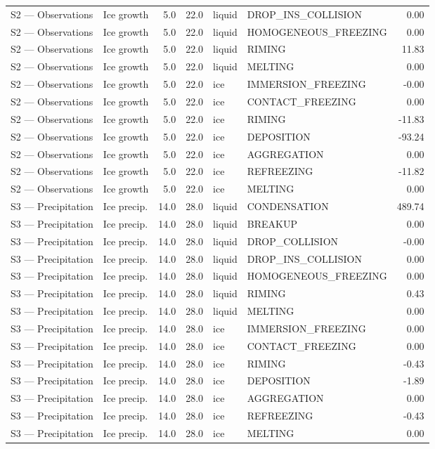 \begin{table}[p]
{\begin{tabular}{llrrllr}
S2 — Observations & Ice growth & 5.0 & 22.0 & liquid & DROP\_INS\_COLLISION & 0.00 \\
S2 — Observations & Ice growth & 5.0 & 22.0 & liquid & HOMOGENEOUS\_FREEZING & 0.00 \\
S2 — Observations & Ice growth & 5.0 & 22.0 & liquid & RIMING & 11.83 \\
S2 — Observations & Ice growth & 5.0 & 22.0 & liquid & MELTING & 0.00 \\
S2 — Observations & Ice growth & 5.0 & 22.0 & ice & IMMERSION\_FREEZING & -0.00 \\
S2 — Observations & Ice growth & 5.0 & 22.0 & ice & CONTACT\_FREEZING & 0.00 \\
S2 — Observations & Ice growth & 5.0 & 22.0 & ice & RIMING & -11.83 \\
S2 — Observations & Ice growth & 5.0 & 22.0 & ice & DEPOSITION & -93.24 \\
S2 — Observations & Ice growth & 5.0 & 22.0 & ice & AGGREGATION & 0.00 \\
S2 — Observations & Ice growth & 5.0 & 22.0 & ice & REFREEZING & -11.82 \\
S2 — Observations & Ice growth & 5.0 & 22.0 & ice & MELTING & 0.00 \\
S3 — Precipitation & Ice precip. & 14.0 & 28.0 & liquid & CONDENSATION & 489.74 \\
S3 — Precipitation & Ice precip. & 14.0 & 28.0 & liquid & BREAKUP & 0.00 \\
S3 — Precipitation & Ice precip. & 14.0 & 28.0 & liquid & DROP\_COLLISION & -0.00 \\
S3 — Precipitation & Ice precip. & 14.0 & 28.0 & liquid & DROP\_INS\_COLLISION & 0.00 \\
S3 — Precipitation & Ice precip. & 14.0 & 28.0 & liquid & HOMOGENEOUS\_FREEZING & 0.00 \\
S3 — Precipitation & Ice precip. & 14.0 & 28.0 & liquid & RIMING & 0.43 \\
S3 — Precipitation & Ice precip. & 14.0 & 28.0 & liquid & MELTING & 0.00 \\
S3 — Precipitation & Ice precip. & 14.0 & 28.0 & ice & IMMERSION\_FREEZING & 0.00 \\
S3 — Precipitation & Ice precip. & 14.0 & 28.0 & ice & CONTACT\_FREEZING & 0.00 \\
S3 — Precipitation & Ice precip. & 14.0 & 28.0 & ice & RIMING & -0.43 \\
S3 — Precipitation & Ice precip. & 14.0 & 28.0 & ice & DEPOSITION & -1.89 \\
S3 — Precipitation & Ice precip. & 14.0 & 28.0 & ice & AGGREGATION & 0.00 \\
S3 — Precipitation & Ice precip. & 14.0 & 28.0 & ice & REFREEZING & -0.43 \\
S3 — Precipitation & Ice precip. & 14.0 & 28.0 & ice & MELTING & 0.00 \\
\hline
\end{tabular}
}
\end{table}
